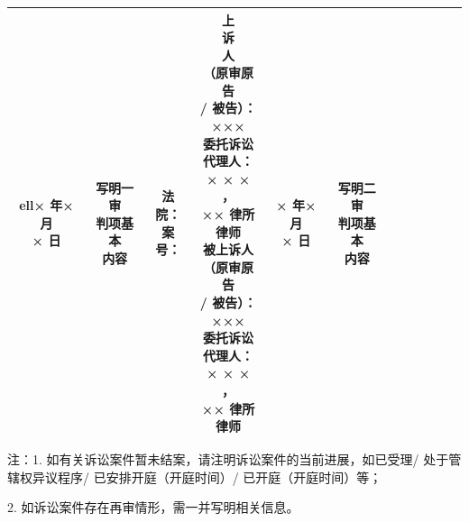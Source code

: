 \documentclass[a4paper,12pt,twoside]{ctexart}
\begin{document}
{\begin{tabular}{|c|c|c|c|c|c|c|c|c|c|c|c|}
ell{× 年× 月\\× 日} & \makecell[l]{写明一审\\判项基本\\内容} & \makecell[l]{法院：\\案号：} & \makecell[l]{上\\诉\\人\\（原审原告\\/ 被告）：\\×××\\委托诉讼\\代理人：\\× × × ，\\×× 律所\\律师\\被上诉人\\（原审原告\\/ 被告）：\\×××\\委托诉讼\\代理人：\\× × × ，\\×× 律所\\律师} & \makecell{× 年× 月\\× 日} & \makecell[l]{写明二审\\判项基本\\内容} \\ \hline
\end{tabular}
}

\vspace{10bp}
\noindent\fontsize{8bp}{10bp}\selectfont 注：1. 如有关诉讼案件暂未结案，请注明诉讼案件的当前进展，如已受理/ 处于管辖权异议程序/ 已安排开庭（开庭时间）/ 已开庭（开庭时间）等；\par
\hspace*{1.5em} 2. 如诉讼案件存在再审情形，需一并写明相关信息。
\end{document}
